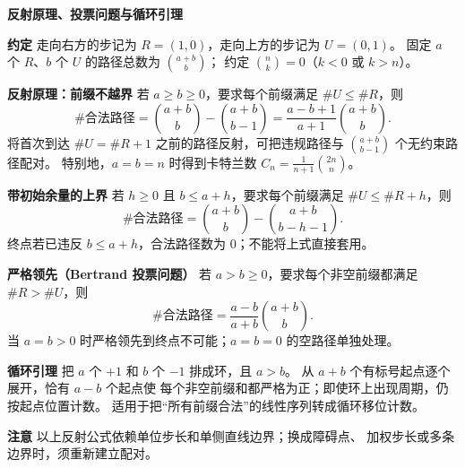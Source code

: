 \textbf{反射原理、投票问题与循环引理}

\textbf{约定}
走向右方的步记为 $R=(1,0)$，走向上方的步记为 $U=(0,1)$。
固定 $a$ 个 $R$、$b$ 个 $U$ 的路径总数为 $\binom{a+b}{b}$；
约定 $\binom{n}{k}=0$（$k<0$ 或 $k>n$）。

\textbf{反射原理：前缀不越界}
若 $a\ge b\ge0$，要求每个前缀满足 $\#U\le\#R$，则
\[
\#\text{合法路径}
=\binom{a+b}{b}-\binom{a+b}{b-1}
=\frac{a-b+1}{a+1}\binom{a+b}{b}.
\]
将首次到达 $\#U=\#R+1$ 之前的路径反射，可把违规路径与
$\binom{a+b}{b-1}$ 个无约束路径配对。
特别地，$a=b=n$ 时得到卡特兰数
$C_n=\frac1{n+1}\binom{2n}{n}$。

\textbf{带初始余量的上界}
若 $h\ge0$ 且 $b\le a+h$，要求每个前缀满足
$\#U\le\#R+h$，则
\[
\#\text{合法路径}
=\binom{a+b}{b}-\binom{a+b}{b-h-1}.
\]
终点若已违反 $b\le a+h$，合法路径数为 $0$；不能将上式直接套用。

\textbf{严格领先（Bertrand 投票问题）}
若 $a>b\ge0$，要求每个非空前缀都满足 $\#R>\#U$，则
\[
\#\text{合法路径}=\frac{a-b}{a+b}\binom{a+b}{b}.
\]
当 $a=b>0$ 时严格领先到终点不可能；$a=b=0$ 的空路径单独处理。

\textbf{循环引理}
把 $a$ 个 $+1$ 和 $b$ 个 $-1$ 排成环，且 $a>b$。
从 $a+b$ 个有标号起点逐个展开，恰有 $a-b$ 个起点使
每个非空前缀和都严格为正；即使环上出现周期，仍按起点位置计数。
适用于把“所有前缀合法”的线性序列转成循环移位计数。

\textbf{注意}
以上反射公式依赖单位步长和单侧直线边界；换成障碍点、
加权步长或多条边界时，须重新建立配对。
